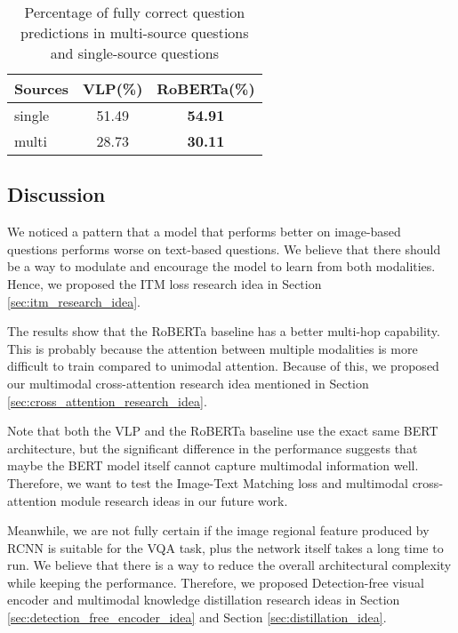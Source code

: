 \documentclass[nohyperref]{article}
\theoremstyle{plain}
\theoremstyle{definition}
\theoremstyle{remark}
\begin{document}
\begin{table}[h]
    \centering
    \footnotesize
    \begin{tabular}{lcc}
        \toprule[1.2pt]
        Sources & VLP(\%) & RoBERTa(\%) \\
        \toprule
        single & 51.49 & \textbf{54.91}  \\
        multi  & 28.73 & \textbf{30.11}  \\
        \bottomrule[1.2pt]
    \end{tabular}
    \caption{Percentage of fully correct question predictions in multi-source questions and single-source questions}
    \label{tab:vlp_correct_attribute}
    \vspace{-5pt}
\end{table}

\subsection{Discussion}

We noticed a pattern that a model that performs better on image-based questions performs worse on text-based questions.
We believe that there should be a way to modulate and encourage the model to learn from both modalities.
Hence, we proposed the ITM loss research idea in Section \ref{sec:itm_research_idea}.

The results show that the RoBERTa baseline has a better multi-hop capability.
This is probably because the attention between multiple modalities is more difficult to train compared to unimodal attention.
Because of this, we proposed our multimodal cross-attention research idea mentioned in Section \ref{sec:cross_attention_research_idea}.

Note that both the VLP and the RoBERTa baseline use the exact same BERT architecture, but the significant difference in the performance suggests that maybe the BERT model itself cannot capture multimodal information well.
Therefore, we want to test the Image-Text Matching loss and multimodal cross-attention module research ideas in our future work.

Meanwhile, we are not fully certain if the image regional feature produced by RCNN is suitable for the VQA task, plus the network itself takes a long time to run.
We believe that there is a way to reduce the overall architectural complexity while keeping the performance.
Therefore, we proposed Detection-free visual encoder and multimodal knowledge distillation research ideas in Section \ref{sec:detection_free_encoder_idea} and Section \ref{sec:distillation_idea}.
\end{document}
